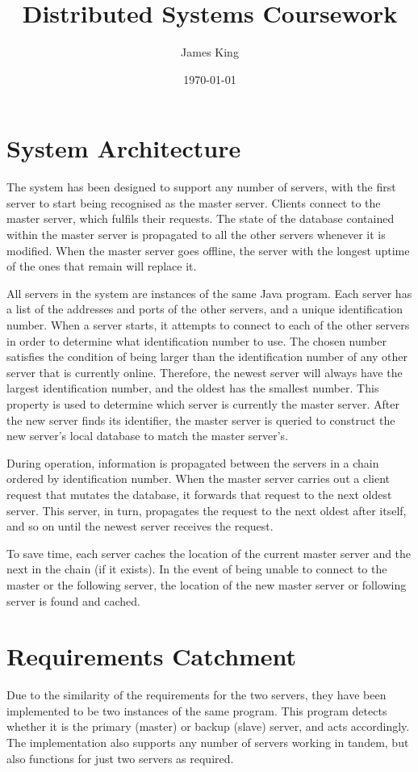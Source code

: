 \documentclass[a4paper,11pt]{article}
\title{Distributed Systems Coursework}
\date{\today}
\author{James King}
\begin{document}
\maketitle

\section{System Architecture}
The system has been designed to support any number of servers, with the first server to start being recognised as the master server. Clients connect to the master server, which fulfils their requests. The state of the database contained within the master server is propagated to all the other servers whenever it is modified. When the master server goes offline, the server with the longest uptime of the ones that remain will replace it.

All servers in the system are instances of the same Java program. Each server has a list of the addresses and ports of the other servers, and a unique identification number. When a server starts, it attempts to connect to each of the other servers in order to determine what identification number to use. The chosen number satisfies the condition of being larger than the identification number of any other server that is currently online. Therefore, the newest server will always have the largest identification number, and the oldest has the smallest number. This property is used to determine which server is currently the master server. After the new server finds its identifier, the master server is queried to construct the new server's local database to match the master server's.

During operation, information is propagated between the servers in a chain ordered by identification number. When the master server carries out a client request that mutates the database, it forwards that request to the next oldest server. This server, in turn, propagates the request to the next oldest after itself, and so on until the newest server receives the request.

To save time, each server caches the location of the current master server and the next in the chain (if it exists). In the event of being unable to connect to the master or the following server, the location of the new master server or following server is found and cached.

\section{Requirements Catchment}
Due to the similarity of the requirements for the two servers, they have been implemented to be two instances of the same program. This program detects whether it is the primary (master) or backup (slave) server, and acts accordingly. The implementation also supports any number of servers working in tandem, but also functions for just two servers as required.
\end{document}
